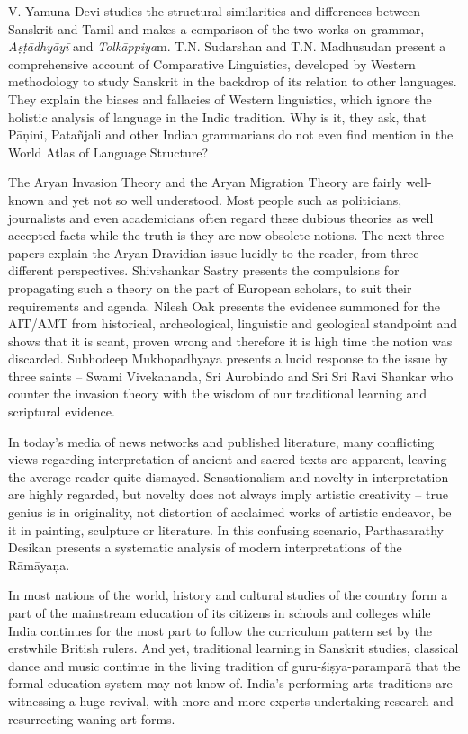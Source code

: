 V. Yamuna Devi studies the structural similarities and differences between Sanskrit and Tamil and makes a comparison of the two works on grammar, \textit{Aṣṭādhyāyī} and \textit{Tolkāppiya}m. T.N. Sudarshan and T.N. Madhusudan present a comprehensive account of Comparative Linguistics, developed by Western methodology to study Sanskrit in the backdrop of its relation to other languages. They explain the biases and fallacies of Western linguistics, which ignore the holistic analysis of language in the Indic tradition. Why is it, they ask, that Pāņini, Patañjali and other Indian grammarians do not even find mention in the World Atlas of Language Structure?

The Aryan Invasion Theory and the Aryan Migration Theory are fairly well-known and yet not so well understood. Most people such as politicians, journalists and even academicians often regard these dubious theories as well accepted facts while the truth is they are now obsolete notions. The next three papers explain the Aryan-Dravidian issue lucidly to the reader, from three different perspectives. Shivshankar Sastry presents the compulsions for propagating such a theory on the part of European scholars, to suit their requirements and agenda. Nilesh Oak presents the evidence summoned for the AIT/AMT from historical, archeological, linguistic and geological standpoint and shows that it is scant, proven wrong and therefore it is high time the notion was discarded. Subhodeep Mukhopadhyaya presents a lucid response to the issue by three saints – Swami Vivekananda, Sri Aurobindo and Sri Sri Ravi Shankar who counter the invasion theory with the wisdom of our traditional learning and scriptural evidence.

In today’s media of news networks and published literature, many conflicting views regarding interpretation of ancient and sacred texts are apparent, leaving the average reader quite dismayed. Sensationalism and novelty in interpretation are highly regarded, but novelty does not always imply artistic creativity – true genius is in originality, not distortion of acclaimed works of artistic endeavor, be it in painting, sculpture or literature. In this confusing scenario, Parthasarathy Desikan presents a systematic analysis of modern interpretations of the Rāmāyaņa.

In most nations of the world, history and cultural studies of the country form a part of the mainstream education of its citizens in schools and colleges while India continues for the most part to follow the curriculum pattern set by the erstwhile British rulers. And yet, traditional learning in Sanskrit studies, classical dance and music continue in the living tradition of guru-śiṣya-paramparā that the formal education system may not know of. India’s performing arts traditions are witnessing a huge revival, with more and more experts undertaking research and resurrecting waning art forms.

